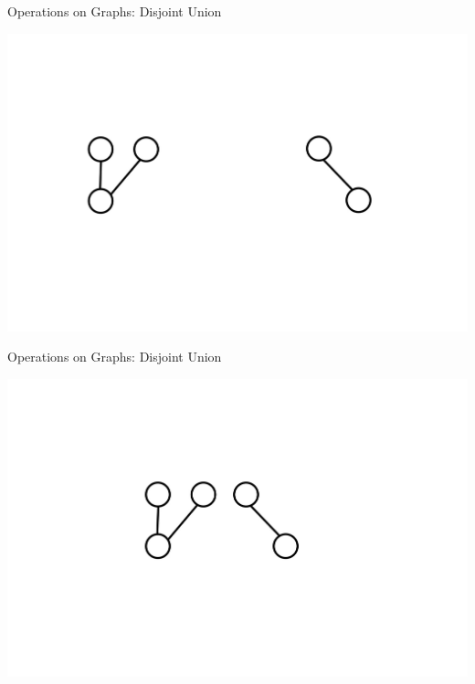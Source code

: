 \documentclass[aspectratio=169]{beamer}
\begin{document}
\begin{frame}{Operations on Graphs: Disjoint Union}
    \begin{center}
        \includegraphics[width=1.0\textwidth]{images/output-13-0.jpg}
    \end{center}
\end{frame}

\begin{frame}{Operations on Graphs: Disjoint Union}
    \begin{center}
        \includegraphics[width=1.0\textwidth]{images/output-14-0.jpg}
    \end{center}
\end{frame}
\end{document}
